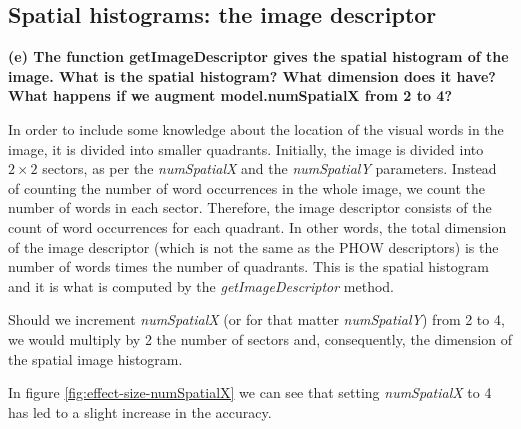 \subsection{Spatial histograms: the image descriptor}

{\bfseries (e) The function getImageDescriptor gives the spatial histogram of the image. What is the spatial histogram? What dimension does it have? What happens if we augment model.numSpatialX from 2 to 4?}

In order to include some knowledge about the location of the visual words in the image, it is divided into smaller quadrants. Initially, the image is divided into $ 2 \times 2 $ sectors, as per the \emph{numSpatialX} and the \emph{numSpatialY} parameters. Instead of counting the number of word occurrences in the whole image, we count the number of words in each sector. Therefore, the image descriptor consists of the count of word occurrences for each quadrant. In other words, the total dimension of the image descriptor (which is not the same as the PHOW descriptors) is the number of words times the number of quadrants. This is the spatial histogram and it is what is computed by the \emph{getImageDescriptor} method.

Should we increment \emph{numSpatialX} (or for that matter \emph{numSpatialY}) from 2 to 4, we would multiply by 2 the number of sectors and, consequently, the dimension of the spatial image histogram.

In figure \ref{fig:effect-size-numSpatialX} we can see that setting \emph{numSpatialX} to 4 has led to a slight increase in the accuracy.


